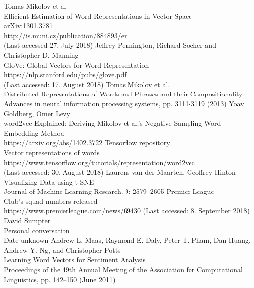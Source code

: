 \documentclass[10pt, a4paper]{UUThesisTemplate}
\begin{document}
\begin{thebibliography}{--}
     Tomas Mikolov et al\\
    Efficient Estimation of Word Representations in Vector Space\\
    arXiv:1301.3781\\
    \url{http://is.muni.cz/publication/884893/en}\\
    (Last accessed 27. July 2018)
     Jeffrey Pennington, Richard Socher and Christopher D. Manning\\
    GloVe: Global Vectors for Word Representation\\    
    \url{https://nlp.stanford.edu/pubs/glove.pdf}\\
    (Last accessed: 17. August 2018)
     Tomas Mikolov et al.\\
    Distributed Representations of Words and Phrases and their Compositionality\\
    Advances in neural information processing systems, pp. 3111-3119 (2013)
     Yoav Goldberg, Omer Levy\\
    word2vec Explained: Deriving Mikolov et al.’s Negative-Sampling Word-Embedding Method\\
    \url{https://arxiv.org/abs/1402.3722}
     Tensorflow repository\\
    Vector representations of words\\
    \url{https://www.tensorflow.org/tutorials/representation/word2vec}\\
    (Last accessed: 30. August 2018)
     Laurens van der Maarten, Geoffrey Hinton\\
    Visualizing Data using t-SNE\\
    Journal of Machine Learning Research. 9: 2579–2605
     Premier League\\
    Club's squad numbers released\\
    \url{https://www.premierleague.com/news/69430}
    (Last accessed: 8. September 2018)
     David Sumpter\\
    Personal conversation\\
    Date unknown
     Andrew L. Maas, Raymond E. Daly, Peter T. Pham, Dan Huang, Andrew Y. Ng, and Christopher Potts\\
Learning Word Vectors for Sentiment Analysis\\
Proceedings of the 49th Annual Meeting of the Association for Computational Linguistics, pp. 142–150 (June 2011)

\end{thebibliography}
\end{document}
